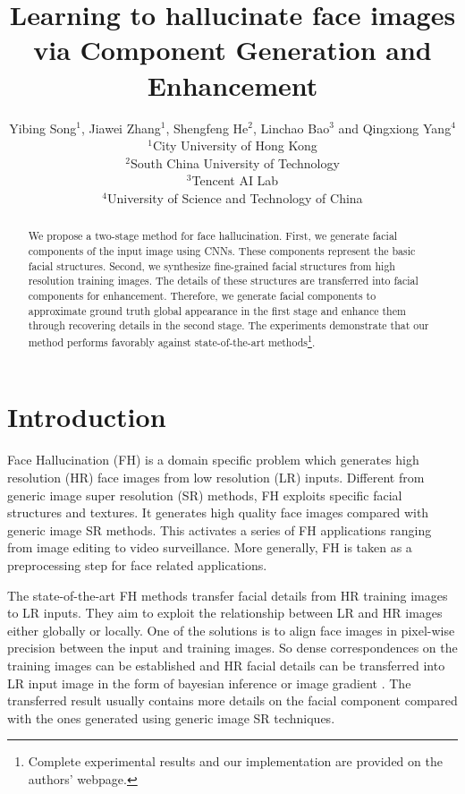 \documentclass{article}
\title{Learning to hallucinate face images via Component Generation and Enhancement}
\author{Yibing Song$^1$, Jiawei Zhang$^1$, Shengfeng He$^2$, Linchao Bao$^3$ and Qingxiong Yang$^4$\\
$^1$City University of Hong Kong\\
$^2$South China University of Technology\\
$^3$Tencent AI Lab\\
$^4$University of Science and Technology of China\\}
\begin{document}
\maketitle

\begin{abstract}
We propose a two-stage method for face hallucination. First, we generate facial components of the input image using CNNs. These components represent the basic facial structures. Second, we synthesize fine-grained facial structures from high resolution training images. The details of these structures are transferred into facial components for enhancement. Therefore, we generate facial components to approximate ground truth global appearance in the first stage and enhance them through recovering details in the second stage. The experiments demonstrate that our method performs favorably against state-of-the-art methods\footnote{Complete experimental results and our implementation are provided on the authors' webpage.}.
\end{abstract}

\section{Introduction}
Face Hallucination (FH) is a domain specific problem which generates high resolution (HR) face images from low resolution (LR) inputs. Different from generic image super resolution (SR) methods, FH exploits specific facial structures and textures. It generates high quality face images compared with generic image SR methods. This activates a series of FH applications ranging from image editing to video surveillance. More generally, FH is taken as a preprocessing step for face related applications.

The state-of-the-art FH methods transfer facial details from HR training images to LR inputs. They aim to exploit the relationship between LR and HR images either globally or locally. One of the solutions is to align face images in pixel-wise precision between the input and training images. So dense correspondences on the training images can be established and HR facial details can be transferred into LR input image in the form of bayesian inference \cite{tappen-eccv12-bayesian} or image gradient \cite{Chih-cvpr13-FH}. The transferred result usually contains more details on the facial component compared with the ones generated using generic image SR techniques.
\end{document}
